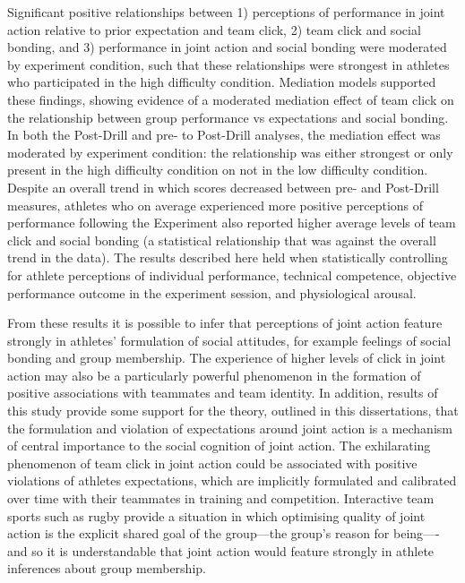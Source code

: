 Significant positive relationships between 1) perceptions of performance in joint action relative to prior expectation and team click, 2) team click and social bonding,  and 3) performance in joint action and social bonding were moderated by experiment condition, such that these relationships were strongest in athletes who participated in the high difficulty condition.  Mediation models supported these findings, showing evidence of a moderated mediation effect of team click on the relationship between group performance vs expectations and social bonding.  In both the Post-Drill and pre- to Post-Drill analyses, the mediation effect was moderated by experiment condition: the relationship was either strongest or only present in the high difficulty condition on not in the low difficulty condition.  Despite an overall trend in which scores decreased between pre- and Post-Drill measures, athletes who on average experienced more positive perceptions of performance following the Experiment also reported higher average levels of team click and social bonding (a statistical relationship that was against the overall trend in the data).  The results described here held when statistically controlling for athlete perceptions of individual performance, technical competence, objective performance outcome in the experiment session, and physiological arousal.

From these results it is possible to infer that perceptions of joint action feature strongly in athletes' formulation of social attitudes, for example feelings of social bonding and group membership.  The experience of higher levels of click in joint action may also be a particularly powerful phenomenon in the formation of positive associations with teammates and team identity.  In addition, results of this study provide some support for the theory, outlined in this dissertations, that the formulation and violation of expectations around joint action is a mechanism of central importance to the social cognition of joint action.  The exhilarating phenomenon of team click in joint action could be associated with positive violations of athletes expectations, which are implicitly formulated and calibrated over time with their teammates in training and competition.  Interactive team sports such as rugby provide a situation in which optimising quality of joint action is the explicit shared goal of the group---the group's reason for being----and so it is understandable that joint action would feature strongly in athlete inferences about group membership.


